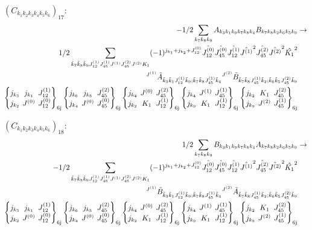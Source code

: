 \documentclass[11pt]{article}
\newcommand{\sixj}[6]{\begingroup\setlength{\arraycolsep}{0.2em}\begin{Bmatrix} #1 & #2 & #3 \\ #4 & #5 & #6 \end{Bmatrix}_{\text{6j}}\endgroup}
\begin{document}
$\left({C}_{{k}_{1}{k}_{2}{k}_{3}{k}_{4}{k}_{5}{k}_{6}}\right)_{17}$:
\begin{align}
-1/2\sum_{{k}_{7}{k}_{8}{k}_{9}}{A}_{{k}_{3}{k}_{1}{k}_{9}{k}_{7}{k}_{8}{k}_{4}}{B}_{{k}_{7}{k}_{8}{k}_{2}{k}_{6}{k}_{5}{k}_{9}}&\rightarrow \notag \\1/2\sum_{\tilde{k}_{7}\tilde{k}_{8}\tilde{k}_{9}J^{(1)}_{12}J^{(1)}_{45}J^{(1)}J^{(2)}_{45}J^{(2)}K_{1}}(-1)^{j_{{k}_{1}} +j_{{k}_{2}} +J^{(0)}_{12} }\hat{J^{(0)}_{12}}\hat{J^{(0)}_{45}}\hat{J^{(1)}_{12}}\hat{J^{(1)}}^{2}\hat{J^{(2)}_{45}}\hat{J^{(2)}}^{2}\hat{K_{1}}^{2}& \notag \\{}^{J^{(1)}}\tilde{A}_{\tilde{k}_{3}\tilde{k}_{1}J^{(1)}_{12}\tilde{k}_{9};\tilde{k}_{7}\tilde{k}_{8}J^{(1)}_{45}\tilde{k}_{4}}{}^{J^{(2)}}\tilde{B}_{\tilde{k}_{7}\tilde{k}_{8}J^{(1)}_{45}\tilde{k}_{2};\tilde{k}_{6}\tilde{k}_{5}J^{(2)}_{45}\tilde{k}_{9}}& \notag \\\sixj{j_{{k}_{3}}}{j_{{k}_{1}}}{J^{(1)}_{12}}{j_{{k}_{2}}}{J^{(0)}}{J^{(0)}_{12}}\sixj{j_{{k}_{6}}}{j_{{k}_{5}}}{J^{(2)}_{45}}{j_{{k}_{4}}}{J^{(0)}}{J^{(0)}_{45}}\sixj{j_{{k}_{4}}}{J^{(0)}}{J^{(2)}_{45}}{j_{{k}_{2}}}{K_{1}}{J^{(1)}_{12}}\sixj{j_{{k}_{4}}}{J^{(1)}}{J^{(1)}_{45}}{j_{{k}_{9}}}{K_{1}}{J^{(1)}_{12}}\sixj{j_{{k}_{2}}}{K_{1}}{J^{(2)}_{45}}{j_{{k}_{9}}}{J^{(2)}}{J^{(1)}_{45}}
\end{align}

$\left({C}_{{k}_{1}{k}_{2}{k}_{3}{k}_{4}{k}_{5}{k}_{6}}\right)_{18}$:
\begin{align}
1/2\sum_{{k}_{7}{k}_{8}{k}_{9}}{B}_{{k}_{3}{k}_{1}{k}_{9}{k}_{7}{k}_{8}{k}_{4}}{A}_{{k}_{7}{k}_{8}{k}_{2}{k}_{6}{k}_{5}{k}_{9}}&\rightarrow \notag \\-1/2\sum_{\tilde{k}_{7}\tilde{k}_{8}\tilde{k}_{9}J^{(1)}_{12}J^{(1)}_{45}J^{(1)}J^{(2)}_{45}J^{(2)}K_{1}}(-1)^{j_{{k}_{1}} +j_{{k}_{2}} +J^{(0)}_{12} }\hat{J^{(0)}_{12}}\hat{J^{(0)}_{45}}\hat{J^{(1)}_{12}}\hat{J^{(1)}}^{2}\hat{J^{(2)}_{45}}\hat{J^{(2)}}^{2}\hat{K_{1}}^{2}& \notag \\{}^{J^{(1)}}\tilde{B}_{\tilde{k}_{3}\tilde{k}_{1}J^{(1)}_{12}\tilde{k}_{9};\tilde{k}_{7}\tilde{k}_{8}J^{(1)}_{45}\tilde{k}_{4}}{}^{J^{(2)}}\tilde{A}_{\tilde{k}_{7}\tilde{k}_{8}J^{(1)}_{45}\tilde{k}_{2};\tilde{k}_{6}\tilde{k}_{5}J^{(2)}_{45}\tilde{k}_{9}}& \notag \\\sixj{j_{{k}_{3}}}{j_{{k}_{1}}}{J^{(1)}_{12}}{j_{{k}_{2}}}{J^{(0)}}{J^{(0)}_{12}}\sixj{j_{{k}_{6}}}{j_{{k}_{5}}}{J^{(2)}_{45}}{j_{{k}_{4}}}{J^{(0)}}{J^{(0)}_{45}}\sixj{j_{{k}_{4}}}{J^{(0)}}{J^{(2)}_{45}}{j_{{k}_{2}}}{K_{1}}{J^{(1)}_{12}}\sixj{j_{{k}_{4}}}{J^{(1)}}{J^{(1)}_{45}}{j_{{k}_{9}}}{K_{1}}{J^{(1)}_{12}}\sixj{j_{{k}_{2}}}{K_{1}}{J^{(2)}_{45}}{j_{{k}_{9}}}{J^{(2)}}{J^{(1)}_{45}}
\end{align}
\end{document}
